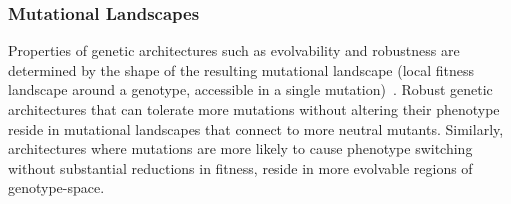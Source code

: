 \documentclass[10pt,letterpaper]{article}
\begin{document}
\subsubsection*{Mutational Landscapes}
Properties of genetic architectures such as evolvability and robustness are determined by the shape of the resulting mutational landscape (local fitness landscape around a genotype, accessible in a single mutation)~\cite{andreas_wagner_robustness_2008}. Robust genetic architectures that can tolerate more mutations without altering their phenotype reside in mutational landscapes that connect to more neutral mutants. Similarly, architectures where mutations are more likely to cause phenotype switching without substantial reductions in fitness, reside in more evolvable regions of genotype-space.
\end{document}
